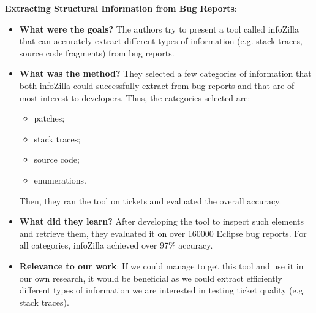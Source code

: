 \documentclass{mprop}
\begin{document}
\textbf{Extracting Structural Information from Bug Reports}\cite{bettenburg2008extracting}:
\begin{itemize}
  \item \textbf{What were the goals?}
    The authors try to present a tool called infoZilla that can accurately
    extract different types of information (e.g. stack traces, source code
    fragments) from bug reports.
  \item \textbf{What was the method?}
    They selected a few categories of information that both infoZilla could
    successfully extract from bug reports and that are of most interest to developers. Thus,
    the categories selected are:
      \begin{itemize}
        \item patches;
        \item stack traces;
        \item source code;
        \item enumerations.
      \end{itemize}
    Then, they ran the tool on tickets and evaluated the overall accuracy.
  \item \textbf{What did they learn?}
    After developing the tool to inspect such elements and retrieve them, 
    they evaluated it on over 160000 Eclipse bug reports. For all categories, infoZilla
    achieved over 97\% accuracy. 
  \item \textbf{Relevance to our work}:
    If we could manage to get this tool and use it in our own research, it would be
    beneficial as we could extract efficiently different types of information we are
    interested in testing ticket quality (e.g. stack traces).
\end{itemize}
\end{document}
